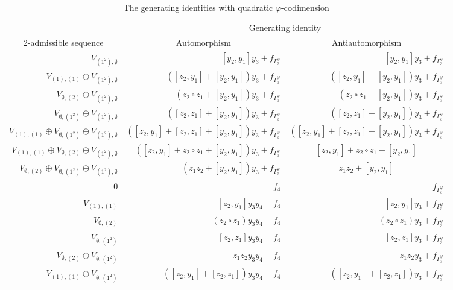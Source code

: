 \documentclass{amsart}
\theoremstyle{definition}
\theoremstyle{remark}
\numberwithin{equation}{section}
\def \Ga{\Gamma}
\def \vp{\varphi}
\def \es{\emptyset}
\begin{document}
\begin{table}[H]
	\caption{The generating identities with quadratic $\vp$-codimension}
	\label{tab3}
	\small
	\centering
	\begin{tabular}{rrr}
		\hline
		&\multicolumn{2}{c}{Generating identity}\\
		\multicolumn{1}{c}{2-admissible sequence}	&\multicolumn{1}{c}{Automorphism}	&\multicolumn{1}{c}{Antiautomorphism}   \\ 
		\hline 
		$V_{(1^2),\es}$   				   &$[y_2,y_1]y_3+f_{\Ga_3^\vp}$ &$[y_2,y_1]y_3+f_{\Ga_3^\vp}$  \\ 
		$V_{(1),(1)} \oplus V_{(1^2),\es}$  		   &$([z_2,y_1]+[y_2,y_1])y_3+f_{\Ga_3^\vp}$ &$([z_2,y_1]+[y_2,y_1])y_3+f_{\Ga_3^\vp}$   \\ 
		$V_{\es,(2)} \oplus V_{(1^2),\es}$    &$(z_2 \circ z_1+[y_2,y_1])y_3+f_{\Ga_3^\vp}$ &$(z_2 \circ z_1+[y_2,y_1])y_3+f_{\Ga_3^\vp}$   \\ 
		$V_{\es,(1^2)} \oplus V_{(1^2),\es}$ &$([z_2,z_1]+[y_2,y_1])y_3+f_{\Ga_3^\vp}$ &$([z_2,z_1]+[y_2,y_1])y_3+f_{\Ga_3^\vp}$   \\ 
		$V_{(1),(1)} \oplus V_{\es,(1^2)} \oplus V_{(1^2),\es}$ &$([z_2,y_1] + [z_2,z_1] + [y_2,y_1])y_3 + f_{\Ga_3^\vp}$ &\multicolumn{1}{c}{$([z_2,y_1] + [z_2,z_1] + [y_2,y_1])y_3 + f_{\Ga_3^\vp}$}   \\ 
		$V_{(1),(1)} \oplus V_{\es,(2)} \oplus V_{(1^2),\es}$ &$([z_2,y_1] + z_2 \circ z_1 + [y_2,y_1])y_3 + f_{\Ga_3^\vp}$ &\multicolumn{1}{c}{$[z_2,y_1] + z_2 \circ z_1 + [y_2,y_1]$}    \\ 
		$V_{\es,(2)} \oplus V_{\es,(1^2)} \oplus V_{(1^2),\es}$   &$(z_1z_2+[y_2,y_1])y_3 + f_{\Ga_3^\vp}$ &\multicolumn{1}{c}{$z_1z_2+[y_2,y_1]$}   \\ 
		\hline	
		$0$  									&$f_4$ &$f_{\Ga_3^\vp}$   \\ 
		$V_{(1),(1)}$   						&$[z_2,y_1]y_3y_4 + f_4$ &$[z_2,y_1]y_3+f_{\Ga_3^\vp}$   \\ 
		$V_{\es,(2)}$   					&$(z_2 \circ z_1)y_3y_4 + f_4$ &$(z_2 \circ z_1)y_3+f_{\Ga_3^\vp}$  \\ 
		$V_{\es,(1^2)}$   				&$[z_2,z_1]y_3y_4 + f_4$ &$[z_2,z_1]y_3+f_{\Ga_3^\vp}$   \\ 
		$V_{\es,(2)} \oplus V_{\es,(1^2)}$   			&$z_1z_2y_3y_4 + f_4$ &$z_1z_2y_3+f_{\Ga_3^\vp}$  \\ 
		$V_{(1),(1)} \oplus V_{\es,(1^2)}$   	&$([z_2,y_1]+[z_2,z_1])y_3y_4 + f_4$ &$([z_2,y_1]+[z_2,z_1])y_3+f_{\Ga_3^\vp}$  \\ 

\end{tabular}
\end{table}
\end{document}
